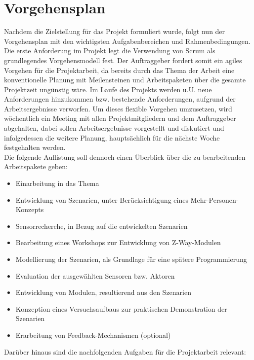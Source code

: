 \documentclass[12pt, oneside, smallheadings]{scrbook}
\begin{document}
\chapter{Vorgehensplan}

Nachdem die Zielstellung für das Projekt formuliert wurde, folgt nun der Vorgehensplan mit den wichtigsten Aufgabenbereichen und Rahmenbedingungen. Die erste Anforderung im Projekt legt die Verwendung von Scrum als grundlegendes Vorgehensmodell fest. Der Auftraggeber fordert somit ein agiles Vorgehen für die Projektarbeit, da bereits durch das Thema der Arbeit eine konventionelle Planung mit Meilensteinen und Arbeitspaketen über die gesamte Projektzeit ungünstig wäre. Im Laufe des Projekts werden u.U. neue Anforderungen hinzukommen bzw. bestehende Anforderungen, aufgrund der Arbeitsergebnisse verworfen. Um dieses flexible Vorgehen umzusetzen, wird wöchentlich ein Meeting mit allen Projektmitgliedern und dem Auftraggeber abgehalten, dabei sollen Arbeitsergebnisse vorgestellt und diskutiert und infolgedessen die weitere Planung, hauptsächlich für die nächste Woche festgehalten werden.\\
Die folgende Auflistung soll dennoch einen Überblick über die zu bearbeitenden \glqq Arbeitspakete\grqq{} geben:\\

\begin{itemize}
\item Einarbeitung in das Thema
\item Entwicklung von Szenarien, unter Berücksichtigung eines Mehr-Personen-Konzepts
\item Sensorrecherche, in Bezug auf die entwickelten Szenarien
\item Bearbeitung eines Workshops zur Entwicklung von Z-Way-Modulen
\item Modellierung der Szenarien, als Grundlage für eine spätere Programmierung
\item Evaluation der ausgewählten Sensoren bzw. Aktoren
\item Entwicklung von Modulen, resultierend aus den Szenarien
\item Konzeption eines Versuchsaufbaus zur praktischen Demonstration der Szenarien
\item Erarbeitung von Feedback-Mechanismen (optional)\\
\end{itemize}
\noindent
Darüber hinaus sind die nachfolgenden Aufgaben für die Projektarbeit relevant:\\
\end{document}

